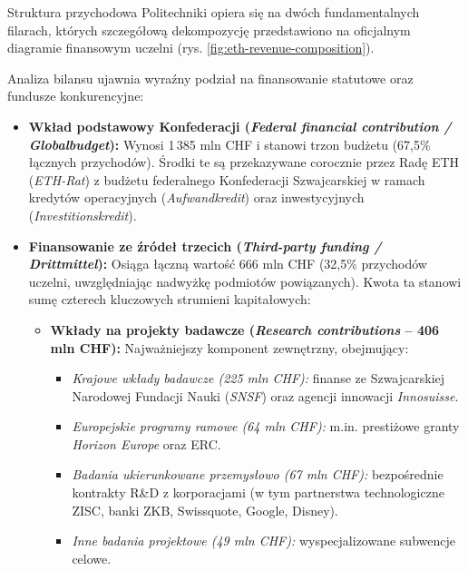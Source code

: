 Struktura przychodowa Politechniki opiera się na dwóch fundamentalnych filarach, których szczegółową dekompozycję przedstawiono na oficjalnym diagramie finansowym uczelni (rys. \ref{fig:eth-revenue-composition}).



Analiza bilansu ujawnia wyraźny podział na finansowanie statutowe oraz fundusze konkurencyjne:
\begin{itemize}
    \item \textbf{Wkład podstawowy Konfederacji (\textit{Federal financial contribution / Globalbudget}):} Wynosi 1\,385 mln CHF i stanowi trzon budżetu (67,5\% łącznych przychodów). Środki te są przekazywane corocznie przez Radę ETH (\textit{ETH-Rat}) z budżetu federalnego Konfederacji Szwajcarskiej w ramach kredytów operacyjnych (\textit{Aufwandkredit}) oraz inwestycyjnych (\textit{Investitionskredit}).
    \item \textbf{Finansowanie ze źródeł trzecich (\textit{Third-party funding / Drittmittel}):} Osiąga łączną wartość 666 mln CHF (32,5\% przychodów uczelni, uwzględniając nadwyżkę podmiotów powiązanych). Kwota ta stanowi sumę czterech kluczowych strumieni kapitałowych:
    \begin{itemize}
        \item \textbf{Wkłady na projekty badawcze (\textit{Research contributions} -- 406 mln CHF):} Najważniejszy komponent zewnętrzny, obejmujący:
        \begin{itemize}
            \item \textit{Krajowe wkłady badawcze (225 mln CHF):} finanse ze Szwajcarskiej Narodowej Fundacji Nauki (\textit{SNSF}) oraz agencji innowacji \textit{Innosuisse}.
            \item \textit{Europejskie programy ramowe (64 mln CHF):} m.in. prestiżowe granty \textit{Horizon Europe} oraz ERC.
            \item \textit{Badania ukierunkowane przemysłowo (67 mln CHF):} bezpośrednie kontrakty R\&D z korporacjami (w tym partnerstwa technologiczne ZISC, banki ZKB, Swissquote, Google, Disney).
            \item \textit{Inne badania projektowe (49 mln CHF):} wyspecjalizowane subwencje celowe.

\end{itemize}
\end{itemize}
\end{itemize}
